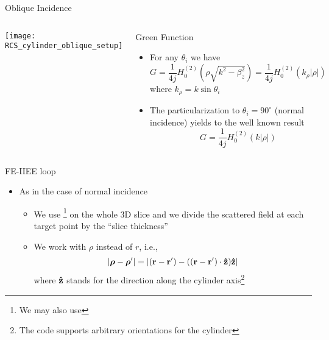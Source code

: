 \begin{frame}[allowframebreaks]{Oblique Incidence}
    \framebreak %

  \begin{columns}
     \centering
    \texttt{[image: RCS\_cylinder\_oblique\_setup]}
    
     \centering
    \begin{block}{Green Function}
      \begin{itemize}
      \item For any  $\theta_i$ we have
        \begin{equation*}
          G = \dfrac{1}{4j} H_0^{(2)}\left( \rho\sqrt{k^2-\beta_z^2}\right) 
          = \dfrac{1}{4j} H_0^{(2)}\left( k_\rho|\rho|\right)
        \end{equation*}
      where $k_\rho=k\sin\theta_i$
        
      \item The particularization to $\theta_i=90^\circ$ (normal
        incidence) yields to the well known result
        \begin{equation*}
          G = \dfrac{1}{4j} H_0^{(2)}(k|\rho|)
        \end{equation*}
        
      \end{itemize}
    \end{block}
  \end{columns}
  
    \framebreak %

    
    \begin{block}{FE-IIEE loop}
      \begin{itemize}
      \item As in the case of normal incidence
        \begin{itemize}
        \item We use {\GreenD}\footnote{We may also use {\GreenTEw}}
          on the whole 3D slice and we divide  the scattered field
          at each target point by the ``slice thickness''

        \item We work with $\rho$ instead of $r$, i.e.,
          \begin{equation*}
            |\boldsymbol{\rho}-\boldsymbol{\rho}^\prime|=|(\mathbf{r}-\mathbf{r^\prime})-((\mathbf{r}-\mathbf{r^\prime})\cdot\mathbf{\hat{z}})\mathbf{\hat{z}}|
          \end{equation*}
          where $\mathbf{\hat{z}}$ stands for the direction along the cylinder
          axis\footnote{The code supports arbitrary orientations for the
            cylinder}
        \end{itemize}


\end{itemize}
\end{block}
\end{frame}
